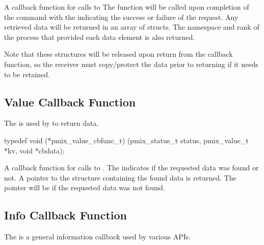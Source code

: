 \descr

A callback function for calls to 
The function will be called upon completion of the command with the  indicating the success or failure of the request.
Any retrieved data will be returned in an array of  structs.
The namespace and rank of the process that provided each data element is also returned.

Note that these structures will be released upon return from the callback function, so the receiver must copy/protect the data prior to returning if it needs to be retained.


\subsection{Value Callback Function}

\summary

The  is used by  to return data.

\cspecificstart
\begin{codepar}
typedef void (*pmix_value_cbfunc_t)
    (pmix_status_t status,
     pmix_value_t *kv, void *cbdata);
\end{codepar}
\cspecificend

\begin{arglist}
\end{arglist}


\descr

A callback function for calls to .
The  indicates if the requested data was found or not.
A pointer to the  structure containing the found data is returned.
The pointer will be  if the requested data was not found.


\subsection{Info Callback Function}

\summary

The  is a general information callback used by various APIs.

